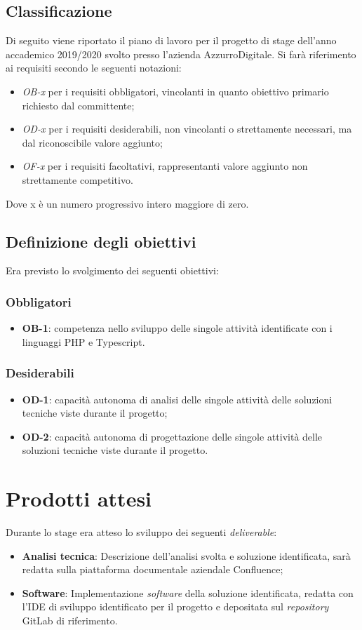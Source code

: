 \subsection{Classificazione}
Di seguito viene riportato il piano di lavoro per il progetto di stage dell'anno accademico 2019/2020 svolto presso l'azienda AzzurroDigitale.
Si farà riferimento ai requisiti secondo le seguenti notazioni:
\begin{itemize}
	\item \textit{OB-x} per i requisiti obbligatori, vincolanti in quanto obiettivo primario richiesto dal committente;
	\item \textit{OD-x} per i requisiti desiderabili, non vincolanti o strettamente necessari,
	ma dal riconoscibile valore aggiunto;
	\item \textit{OF-x} per i requisiti facoltativi, rappresentanti valore aggiunto non strettamente competitivo.
\end{itemize}
Dove x è un numero progressivo intero maggiore di zero.

\subsection{Definizione degli obiettivi}
Era previsto lo svolgimento dei seguenti obiettivi:
\subsubsection*{Obbligatori}
\begin{itemize}
 \item \textbf{OB-1}: competenza nello sviluppo delle singole attività identificate con i linguaggi \gls{PHP} e Typescript.
\end{itemize}
\subsubsection*{Desiderabili} 
\begin{itemize}
 \item \textbf{OD-1}: capacità autonoma di analisi delle singole attività delle soluzioni tecniche viste durante il progetto;
\item \textbf{OD-2}: capacità autonoma di progettazione delle singole attività delle soluzioni tecniche viste durante il progetto.
\end{itemize}

\section{Prodotti attesi}
Durante lo stage era atteso lo sviluppo dei seguenti \emph{deliverable}:
\begin{itemize}
	\item \textbf{Analisi tecnica}: Descrizione dell’analisi svolta e soluzione identificata, sarà redatta sulla piattaforma documentale aziendale Confluence;
	\item \textbf{Software}: Implementazione \emph{software} della soluzione identificata, redatta con l’IDE di sviluppo identificato per il progetto e depositata sul \emph{repository} GitLab di riferimento.
\end{itemize}


